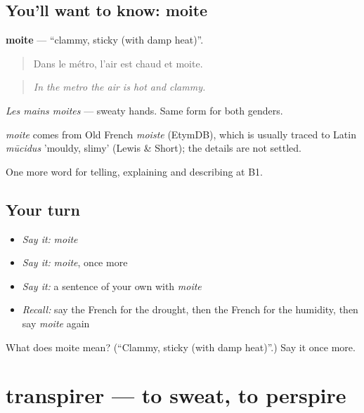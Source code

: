\subsection*{You'll want to know: moite}
\textbf{moite} — \textquotedblleft{}clammy, sticky (with damp heat)\textquotedblright{}.

\begin{quote}
Dans le métro, l'air est chaud et moite.
\end{quote}

\begin{quote}
\emph{In the metro the air is hot and clammy.}
\end{quote}

\emph{Les mains moites} — sweaty hands. Same form for both genders.

\begin{cousinweb}
\emph{moite} comes from Old French \emph{moiste} (EtymDB), which is usually traced to Latin \emph{mūcidus} 'mouldy, slimy' (Lewis \& Short); the details are not settled.
\end{cousinweb}

\begin{grammarlens}[title={What you've built}]
One more word for telling, explaining and describing at B1.
\end{grammarlens}

\subsection*{Your turn}
\begin{itemize}
\raggedright
  \item \emph{Say it:} \emph{moite}
  \item \emph{Say it:} \emph{moite}, once more
  \item \emph{Say it:} a sentence of your own with \emph{moite}
  \item \emph{Recall:} say the French for the drought, then the French for the humidity, then say \emph{moite} again
\end{itemize}

\begin{tcolorbox}[breakable,colback=teal!4,colframe=teal!35!black,title={Before you move on}]
What does moite mean? (\textquotedblleft{}Clammy, sticky (with damp heat)\textquotedblright{}.) Say it once more.
\end{tcolorbox}
\section[transpirer]{transpirer — to sweat, to perspire}

